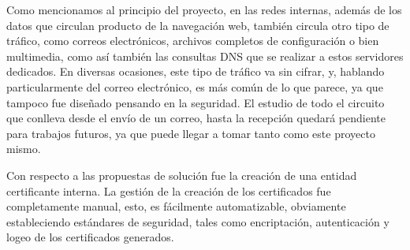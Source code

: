 Como mencionamos al principio del proyecto, en las redes internas, además de
los datos que circulan producto de la navegación web, también circula
otro tipo de tráfico, como correos electrónicos, archivos completos de 
configuración o bien multimedia, como así también las consultas DNS que 
se realizar a estos servidores dedicados. En diversas ocasiones, este 
tipo de tráfico va sin cifrar, y, hablando particularmente del correo electrónico,
es más común de lo que parece, ya que tampoco fue diseñado pensando en la 
seguridad. El estudio de todo el circuito que conlleva desde el envío de 
un correo, hasta la recepción quedará pendiente para trabajos futuros, 
ya que puede llegar a tomar tanto como este proyecto mismo.

Con respecto a las propuestas de solución fue la creación de una entidad 
certificante
interna. La gestión de la creación de los certificados fue completamente 
manual, esto, es fácilmente automatizable, obviamente estableciendo estándares 
de seguridad, tales como encriptación, autenticación y logeo de los 
certificados generados.